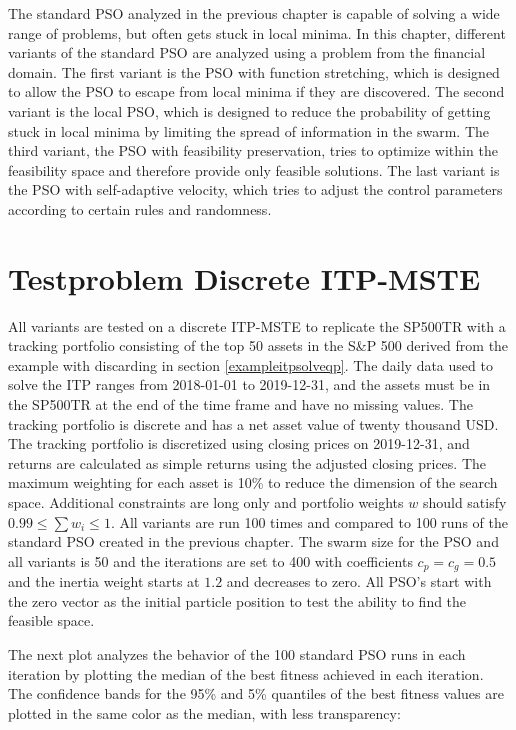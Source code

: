 \documentclass[
  oneside, a4paper, 12pt, openany]{book}
\theoremstyle{definition}
\theoremstyle{definition}
\theoremstyle{definition}
\theoremstyle{definition}
\theoremstyle{remark}
\begin{document}
The standard PSO analyzed in the previous chapter is capable of solving a wide range of problems, but often gets stuck in local minima. In this chapter, different variants of the standard PSO are analyzed using a problem from the financial domain. The first variant is the PSO with function stretching, which is designed to allow the PSO to escape from local minima if they are discovered. The second variant is the local PSO, which is designed to reduce the probability of getting stuck in local minima by limiting the spread of information in the swarm. The third variant, the PSO with feasibility preservation, tries to optimize within the feasibility space and therefore provide only feasible solutions. The last variant is the PSO with self-adaptive velocity, which tries to adjust the control parameters according to certain rules and randomness.

\hypertarget{testproblem-discrete-itp-mste}{%
\section{Testproblem Discrete ITP-MSTE}\label{testproblem-discrete-itp-mste}}

All variants are tested on a discrete ITP-MSTE to replicate the SP500TR with a tracking portfolio consisting of the top 50 assets in the S\&P 500 derived from the example with discarding in section \ref{exampleitpsolveqp}. The daily data used to solve the ITP ranges from 2018-01-01 to 2019-12-31, and the assets must be in the SP500TR at the end of the time frame and have no missing values. The tracking portfolio is discrete and has a net asset value of twenty thousand USD. The tracking portfolio is discretized using closing prices on 2019-12-31, and returns are calculated as simple returns using the adjusted closing prices. The maximum weighting for each asset is 10\% to reduce the dimension of the search space. Additional constraints are long only and portfolio weights \(w\) should satisfy \(0.99 \leq \textstyle\sum w_i \leq 1\). All variants are run 100 times and compared to 100 runs of the standard PSO created in the previous chapter. The swarm size for the PSO and all variants is 50 and the iterations are set to 400 with coefficients \(c_p=c_g=0.5\) and the inertia weight starts at \(1.2\) and decreases to zero. All PSO's start with the zero vector as the initial particle position to test the ability to find the feasible space.

The next plot analyzes the behavior of the 100 standard PSO runs in each iteration by plotting the median of the best fitness achieved in each iteration. The confidence bands for the 95\% and 5\% quantiles of the best fitness values are plotted in the same color as the median, with less transparency:
\end{document}

